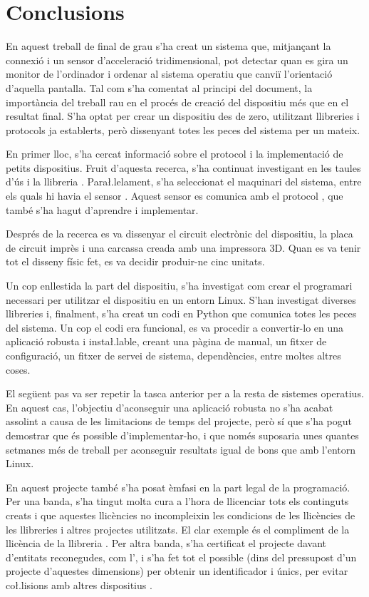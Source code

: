 \chapter{Conclusions}

En aquest treball de final de grau s'ha creat un sistema que, mitjançant la
connexió  i un sensor d'acceleració tridimensional, pot detectar quan
es gira un monitor de l'ordinador i ordenar al sistema operatiu que canviï
l'orientació d'aquella pantalla. Tal com s'ha comentat al principi del
document, la importància del treball rau en el procés de creació del dispositiu
més que en el resultat final. S'ha optat per crear un dispositiu des de zero,
utilitzant llibreries i protocols ja establerts, però dissenyant totes les peces
del sistema per un mateix.

En primer lloc, s'ha cercat informació sobre el protocol  i la
implementació de petits dispositius. Fruit d'aquesta recerca, s'ha continuat
investigant en les taules d'ús  i la llibreria .
Para\l.lelament, s'ha seleccionat el maquinari del sistema, entre els quals hi
havia el sensor . Aquest sensor es comunica amb el protocol
, que també s'ha hagut d'aprendre i implementar.

Després de la recerca es va dissenyar el circuit electrònic del dispositiu,
la placa de circuit imprès i una carcassa creada amb una impressora 3D.
Quan es va tenir tot el disseny físic fet, es va decidir produir-ne cinc unitats.

Un cop enllestida la part del dispositiu, s'ha investigat com crear el
programari necessari per utilitzar el dispositiu en un entorn Linux. S'han
investigat diverses llibreries i, finalment, s'ha creat un codi en Python que
comunica totes les peces del sistema. Un cop el codi era funcional, es va
procedir a convertir-lo en una aplicació robusta i insta\l.lable, creant una
pàgina de manual, un fitxer de configuració, un fitxer de servei de sistema,
dependències, entre moltes altres coses.

El següent pas va ser repetir la tasca anterior per a la resta de sistemes
operatius. En aquest cas, l'objectiu d'aconseguir una aplicació robusta no s'ha
acabat assolint a causa de les limitacions de temps del projecte, però sí que s'ha
pogut demostrar que és possible d'implementar-ho, i que només suposaria
unes quantes setmanes més de treball per aconseguir resultats igual de bons
que amb l'entorn Linux.

En aquest projecte també s'ha posat èmfasi en la part legal de la programació.
Per una banda, s'ha tingut molta cura a l'hora de llicenciar tots els continguts
creats i que aquestes llicències no incompleixin les condicions de les
llicències de les llibreries i altres projectes utilitzats. El clar exemple és
el compliment de la llicència de la llibreria . Per altra banda,
s'ha certificat el projecte davant d'entitats reconegudes, com l', i
s'ha fet tot el possible (dins del pressupost d'un projecte d'aquestes
dimensions) per obtenir un identificador  i  únics, per
evitar co\l.lisions amb altres dispositius .

